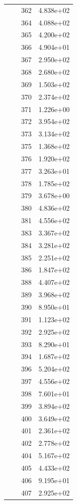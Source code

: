 \documentclass[12pt]{article}
\begin{document}
\begin{longtable}{@{}cccc@{}}
 &  & 362 & 4.838e+02 \\
 &  & 364 & 4.088e+02 \\
 &  & 365 & 4.200e+02 \\
 &  & 366 & 4.904e+01 \\
 &  & 367 & 2.950e+02 \\
 &  & 368 & 2.680e+02 \\
 &  & 369 & 1.503e+02 \\
 &  & 370 & 2.374e+02 \\
 &  & 371 & 1.226e+00 \\
 &  & 372 & 3.954e+02 \\
 &  & 373 & 3.134e+02 \\
 &  & 375 & 1.368e+02 \\
 &  & 376 & 1.920e+02 \\
 &  & 377 & 3.263e+01 \\
 &  & 378 & 1.785e+02 \\
 &  & 379 & 3.678e+00 \\
 &  & 380 & 4.836e+02 \\
 &  & 381 & 4.556e+02 \\
 &  & 383 & 3.367e+02 \\
 &  & 384 & 3.281e+02 \\
 &  & 385 & 2.251e+02 \\
 &  & 386 & 1.847e+02 \\
 &  & 388 & 4.407e+02 \\
 &  & 389 & 3.968e+02 \\
 &  & 390 & 8.950e+01 \\
 &  & 391 & 1.123e+02 \\
 &  & 392 & 2.925e+02 \\
 &  & 393 & 8.290e+01 \\
 &  & 394 & 1.687e+02 \\
 &  & 396 & 5.204e+02 \\
 &  & 397 & 4.556e+02 \\
 &  & 398 & 7.601e+01 \\
 &  & 399 & 3.894e+02 \\
 &  & 400 & 3.649e+02 \\
 &  & 401 & 2.361e+02 \\
 &  & 402 & 2.778e+02 \\
 &  & 404 & 5.167e+02 \\
 &  & 405 & 4.433e+02 \\
 &  & 406 & 9.195e+01 \\
 &  & 407 & 2.925e+02 \\

\end{longtable}
\end{document}
